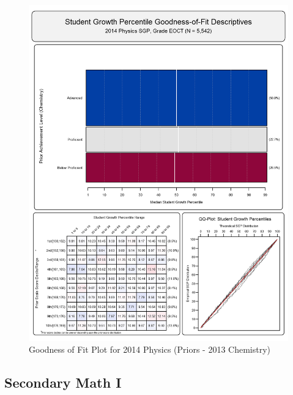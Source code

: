 \documentclass[12pt]{article}
\begin{document}
\begin{figure}[htbp]
\centering
\includegraphics{../img/Goodness_of_Fit/PHYSICS.2014/2014_PHYSICS_EOCT;2013_CHEMISTRY_EOCT.png}
\caption{Goodness of Fit Plot for 2014 Physics (Priors - 2013
Chemistry)}
\end{figure}

\clearpage 

\subsection{Secondary Math I}\label{secondary-math-i}
\end{document}
